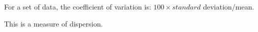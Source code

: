 For a set of data, the coefficient of variation is:
\ensuremath{100 \times standard} deviation/mean.
\par
This is a measure of dispersion.